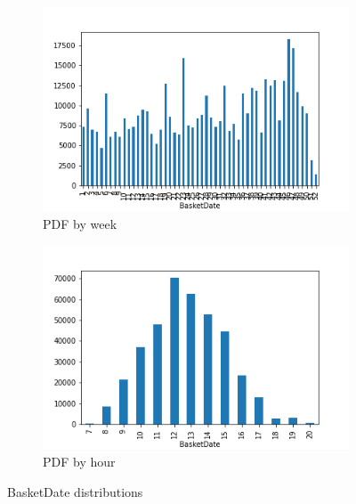 \begin{figure}[!h]
\begin{subfigure}{.33\textwidth}
\end{subfigure}
\begin{subfigure}{.33\textwidth}
\centering
\includegraphics[width=.7\textwidth]{img/week_bar.png}
\caption{PDF by week}
\label{fig:week_bar}
\end{subfigure}
\begin{subfigure}{.33\textwidth}
\centering
\includegraphics[width=.7\textwidth]{img/hour_bar.png}
\caption{PDF by hour}
\label{fig:hour_bar}
\end{subfigure}
\caption{BasketDate distributions}
\end{figure}

